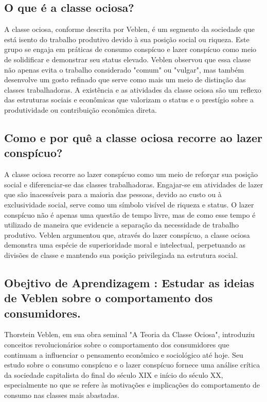 \documentclass[a4paper,12pt]{article}[abntex2]
\begin{document}
\subsection{\textbf{O que é a classe ociosa?}}
A classe ociosa, conforme descrita por Veblen, é um segmento da sociedade que está isento do trabalho produtivo devido à sua posição social ou riqueza. Este grupo se engaja em práticas de consumo conspícuo e lazer conspícuo como meio de solidificar e demonstrar seu status elevado. Veblen observou que essa classe não apenas evita o trabalho considerado "comum" ou "vulgar", mas também desenvolve um gosto refinado que serve como mais um meio de distinção das classes trabalhadoras. A existência e as atividades da classe ociosa são um reflexo das estruturas sociais e econômicas que valorizam o status e o prestígio sobre a produtividade ou contribuição econômica direta.
\subsection{\textbf{Como e por quê a classe ociosa recorre ao lazer conspícuo?}}
A classe ociosa recorre ao lazer conspícuo como um meio de reforçar sua posição social e diferenciar-se das classes trabalhadoras. Engajar-se em atividades de lazer que são inacessíveis para a maioria das pessoas, devido ao custo ou à exclusividade social, serve como um símbolo visível de riqueza e status. O lazer conspícuo não é apenas uma questão de tempo livre, mas de como esse tempo é utilizado de maneira que evidencie a separação da necessidade de trabalho produtivo. Veblen argumentou que, através do lazer conspícuo, a classe ociosa demonstra uma espécie de superioridade moral e intelectual, perpetuando as divisões de classe e mantendo sua posição privilegiada na estrutura social.
\subsection{\textbf{Obejtivo de Aprendizagem : Estudar as ideias de Veblen sobre o comportamento dos consumidores.}}
Thorstein Veblen, em sua obra seminal "A Teoria da Classe Ociosa", introduziu conceitos revolucionários sobre o comportamento dos consumidores que continuam a influenciar o pensamento econômico e sociológico até hoje. Seu estudo sobre o consumo conspícuo e o lazer conspícuo fornece uma análise crítica da sociedade capitalista do final do século XIX e início do século XX, especialmente no que se refere às motivações e implicações do comportamento de consumo nas classes mais abastadas.
\end{document}
